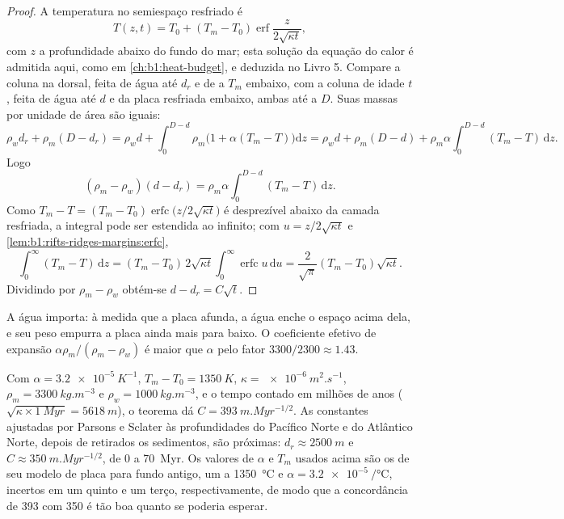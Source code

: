\begin{proof}
A temperatura no semiespaço resfriado é
\[
  T(z, t) = T_0 + (T_m - T_0)\operatorname{erf}\frac{z}{2\sqrt{\kappa t}},
\]
com $z$ a profundidade abaixo do fundo do mar; esta solução da equação do calor é
admitida aqui, como em \cref{ch:b1:heat-budget}, e deduzida no Livro 5. Compare a coluna na dorsal, feita de água até $d_r$ e de
 a $T_m$ embaixo, com a coluna de idade $t$, feita de água até $d$ e
da placa resfriada embaixo, ambas até a  $D$. Suas massas
por unidade de área são iguais:
\[
  \rho_w d_r + \rho_m (D - d_r) = \rho_w d + \int_0^{D-d}\rho_m\bigl(1 + \alpha(T_m - T)\bigr)\mathrm dz
  = \rho_w d + \rho_m (D - d) + \rho_m\alpha\int_0^{D-d}(T_m - T)\,\mathrm dz.
\]
Logo
\[
  (\rho_m - \rho_w)(d - d_r) = \rho_m\alpha\int_0^{D-d}(T_m - T)\,\mathrm dz.
\]
Como $T_m - T = (T_m - T_0)\operatorname{erfc}\bigl(z/2\sqrt{\kappa t}\bigr)$ é
desprezível abaixo da camada resfriada, a integral pode ser estendida ao infinito; com
$u = z/2\sqrt{\kappa t}$ e \cref{lem:b1:rifts-ridges-margins:erfc},
\[
  \int_0^\infty (T_m - T)\,\mathrm dz = (T_m - T_0)\,2\sqrt{\kappa t}\int_0^\infty\operatorname{erfc}u\,\mathrm du
  = \frac{2}{\sqrt\pi}(T_m - T_0)\sqrt{\kappa t}.
\]
Dividindo por $\rho_m - \rho_w$ obtém-se $d - d_r = C\sqrt t$.
\end{proof}

A água importa: à medida que a placa afunda, a água enche o espaço acima dela, e seu peso empurra a placa ainda mais para baixo. O coeficiente efetivo de expansão
$\alpha\rho_m/(\rho_m - \rho_w)$ é maior que $\alpha$ pelo fator
$3300/2300 \approx 1.43$.

Com $\alpha = \qty{3.2e-5}{K^{-1}}$, $T_m - T_0 = \qty{1350}{K}$,
$\kappa = \qty{e-6}{m^2.s^{-1}}$, $\rho_m = \qty{3300}{kg.m^{-3}}$ e
$\rho_w = \qty{1000}{kg.m^{-3}}$, e o tempo contado em milhões de anos
($\sqrt{\kappa\times\qty{1}{Myr}} = \qty{5618}{m}$), o teorema dá
$C = \qty{393}{m.Myr^{-1/2}}$. As constantes ajustadas por Parsons e Sclater às
profundidades do Pacífico Norte e do Atlântico Norte, depois de retirados os sedimentos, são próximas: $d_r \approx \qty{2500}{m}$ e
$C \approx \qty{350}{m.Myr^{-1/2}}$, de 0 a \qty{70}{Myr}. Os valores de
$\alpha$ e $T_m$ usados acima são os de seu modelo de placa para fundo antigo,
um  a \qty{1350}{\degreeCelsius} e
$\alpha = \qty{3.2e-5}{\per\degreeCelsius}$, incertos em um quinto e um terço, respectivamente, de modo que a concordância de 393 com 350 é tão boa quanto se poderia esperar.

